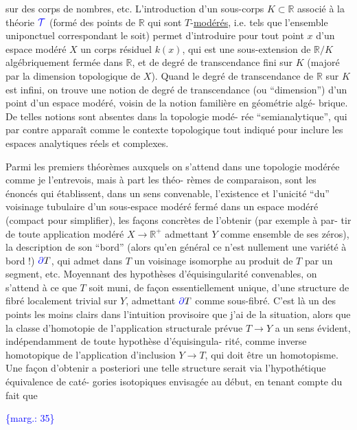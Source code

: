 \documentclass[11pt]{article}
\newcommand{\scanpage}[1]{\par\bigskip\noindent{\small\sffamily[scan #1]}\par}
\newcommand{\mspage}[1]{{\small\sffamily[p.\,#1]}}
\newcommand{\hand}[1]{\textcolor{blue}{#1}}
\newcommand{\margin}[1]{\textcolor{blue}{\{\textsf{marg.:} #1\}}}
\newcommand{\uline}[1]{\underline{#1}}
\begin{document}
sur des corps de nombres, etc. L'introduction d'un sous-corps
$K \subset \mathbb{R}$ associé à la théorie $\hand{\mathcal{T}}$ (formé des points de $\mathbb{R}$ qui sont
$T$-\uline{modérés}, i.e. tels que l'ensemble uniponctuel correspondant le
soit) permet d'introduire pour tout point $x$ d'un espace modéré
$X$ un corps résiduel $k(x)$, qui est une sous-extension de $\mathbb{R}/K$
algébriquement fermée dans $\mathbb{R}$, et de degré de transcendance fini
sur $K$ (majoré par la dimension topologique de $X$). Quand le
degré de transcendance de $\mathbb{R}$ sur $K$ est infini, on trouve une
notion de degré de transcendance (ou ``dimension'') d'un point d'un
espace modéré, voisin de la notion familière en géométrie algé-%
brique. De telles notions sont absentes dans la topologie modé-%
rée ``semianalytique'', qui par contre apparaît comme le contexte
topologique tout indiqué pour inclure les espaces analytiques réels
et complexes.

Parmi les premiers théorèmes auxquels on s'attend dans
une topologie modérée comme je l'entrevois, mais à part les théo-%
rèmes de comparaison, sont les énoncés qui établissent, dans un
sens convenable, l'existence et l'unicité ``du'' voisinage tubulaire
d'un sous-espace modéré fermé dans un espace modéré (compact pour
simplifier), les façons concrètes de l'obtenir (par exemple à par-%
tir de toute application modéré $X \longrightarrow \mathbb{R}^{+}$ admettant $Y$ comme
ensemble de ses zéros), la description de son ``bord'' (alors qu'en
général ce n'est nullement une variété à bord !) $\hand{\partial}T$, qui admet
dans $T$ un voisinage isomorphe au produit de $T$ par un segment,
etc. Moyennant des hypothèses d'équisingularité convenables, on
s'attend à ce que $T$ soit muni, de façon essentiellement unique,
d'une structure de fibré localement trivial sur $Y$, admettant $\hand{\partial}T$
comme sous-fibré. C'est là un des points les moins clairs dans
l'intuition provisoire que j'ai de la situation, alors que la
classe d'homotopie de l'application structurale prévue $T \longrightarrow Y$
a un sens évident, indépendamment de toute hypothèse d'équisingula-%
rité, comme inverse homotopique de l'application d'inclusion $Y \longrightarrow T$,
qui doit être un homotopisme. Une façon d'obtenir a posteriori
une telle structure serait via l'hypothétique équivalence de caté-%
gories isotopiques envisagée au début, en tenant compte du fait que

\margin{35}

\clearpage
\scanpage{119/36}
\mspage{34}
\end{document}
